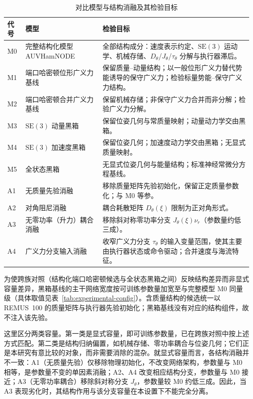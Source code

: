 \documentclass[UTF8,zihao=-4]{ctexrep}
\newcommand{\SE}{\mathrm{SE}}
\begin{document}
\begin{table}[htbp]
  \centering
  \caption{对比模型与结构消融及其检验目标}
  \label{tab:model-comparison-roles}
  \begin{tabularx}{\textwidth}{l>{\raggedright\arraybackslash}p{}>{\raggedright\arraybackslash}X}
    \toprule
    代号 & 模型 & 检验目标 \\
    \midrule
    M0 & 完整结构化模型 AUVHamNODE & 全部结构成分：速度表示约定、\(\SE(3)\) 运动学、机械存储、\(D_\theta\)/\(J_\theta\)/\(\tau_\theta\) 分解与执行器滞后。 \\
    M1 & 端口哈密顿位形广义力基线 & 保留质量--动量结构；以一般位形广义力替代势能诱导的保守广义力；检验标量势能--保守广义力结构。 \\
    M2 & 端口哈密顿合并广义力基线 & 保留机械存储；非保守广义力合并而非分解；检验广义力分解。 \\
    M3 & \(\SE(3)\) 动量黑箱 & 保留位姿几何与常质量映射；动量动力学交由黑箱。 \\
    M4 & \(\SE(3)\) 加速度黑箱 & 保留位姿几何；加速度动力学交由黑箱；无显式质量映射。 \\
    M5 & 全状态黑箱 & 无显式位姿几何与能量结构；标准神经常微分方程基线。 \\
    \midrule
    A1 & 无质量先验消融 & 移除质量矩阵先验初始化，保留正定质量参数化；与 M0 等参。 \\
    A2 & 对角阻尼消融 & 耦合耗散矩阵 \(D_\theta(\xi)\) 限制为正对角形式。 \\
    A3 & 无零功率（升力）耦合消融 & 移除斜对称零功率分支 \(J_\theta(\xi)\nu_r\)（参数量约低三成）。 \\
    A4 & 广义力分支输入消融 & 收窄广义力分支 \(\tau_\theta\) 的输入变量范围，使其主要由执行器状态或命令驱动；合并速度与海流特征。 \\
    \bottomrule
  \end{tabularx}
\end{table}

为使跨族对照（结构化端口哈密顿候选与全状态黑箱之间）反映结构差异而非显式容量差异，黑箱基线的主干网络宽度按可训练参数量加宽至与完整模型 M0 同量级（具体取值见表~\ref{tab:experimental-config}）。含质量结构的候选统一以 REMUS~100 的质量矩阵与执行器先验初始化；黑箱基线没有对应的结构组件，故不注入该先验。

这里区分两类容量。第一类是显式容量，即可训练参数量，已在跨族对照中按上述方式匹配。第二类是结构归纳偏置，如机械存储、零功率耦合与位姿几何；它们正是本研究有意比较的对象，而非需要消除的混杂。就显式容量而言，各结构消融并不一致：A1（无质量先验）仅移除物理初始化，不改变网络架构，参数量与 M0 相等，是参数量不变的单因素消融；A2、A4 改变相应结构分支，参数量与 M0 接近；A3（无零功率耦合）移除斜对称分支 \(J_\theta\)，参数量较 M0 约低三成。因此，当 A3 表现劣化时，其结构作用与该分支容量在本设置下不能完全分离。
\end{document}
